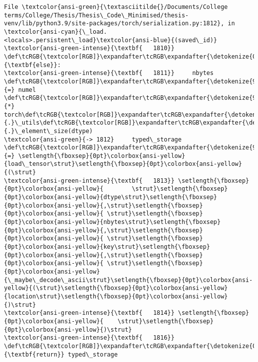 \documentclass[11pt]{article}
\begin{document}
\begin{Verbatim}[commandchars=\\\{\}, frame=single, framerule=2mm, rulecolor=\color{outerrorbackground}]
File \textcolor{ansi-green}{\textasciitilde{}/Documents/College terms/College/Thesis/Thesis\_Code\_Minimised/thesis-venv/lib/python3.9/site-packages/torch/serialization.py:1812}, in \textcolor{ansi-cyan}{\_load.<locals>.persistent\_load}\textcolor{ansi-blue}{(saved\_id)}
\textcolor{ansi-green-intense}{\textbf{   1810}} \def\tcRGB{\textcolor[RGB]}\expandafter\tcRGB\expandafter{\detokenize{0,135,0}}{\textbf{else}}:
\textcolor{ansi-green-intense}{\textbf{   1811}}     nbytes \def\tcRGB{\textcolor[RGB]}\expandafter\tcRGB\expandafter{\detokenize{98,98,98}}{=} numel \def\tcRGB{\textcolor[RGB]}\expandafter\tcRGB\expandafter{\detokenize{98,98,98}}{*} torch\def\tcRGB{\textcolor[RGB]}\expandafter\tcRGB\expandafter{\detokenize{98,98,98}}{.}\_utils\def\tcRGB{\textcolor[RGB]}\expandafter\tcRGB\expandafter{\detokenize{98,98,98}}{.}\_element\_size(dtype)
\textcolor{ansi-green}{-> 1812}     typed\_storage \def\tcRGB{\textcolor[RGB]}\expandafter\tcRGB\expandafter{\detokenize{98,98,98}}{=} \setlength{\fboxsep}{0pt}\colorbox{ansi-yellow}{load\_tensor\strut}\setlength{\fboxsep}{0pt}\colorbox{ansi-yellow}{(\strut}
\textcolor{ansi-green-intense}{\textbf{   1813}} \setlength{\fboxsep}{0pt}\colorbox{ansi-yellow}{        \strut}\setlength{\fboxsep}{0pt}\colorbox{ansi-yellow}{dtype\strut}\setlength{\fboxsep}{0pt}\colorbox{ansi-yellow}{,\strut}\setlength{\fboxsep}{0pt}\colorbox{ansi-yellow}{ \strut}\setlength{\fboxsep}{0pt}\colorbox{ansi-yellow}{nbytes\strut}\setlength{\fboxsep}{0pt}\colorbox{ansi-yellow}{,\strut}\setlength{\fboxsep}{0pt}\colorbox{ansi-yellow}{ \strut}\setlength{\fboxsep}{0pt}\colorbox{ansi-yellow}{key\strut}\setlength{\fboxsep}{0pt}\colorbox{ansi-yellow}{,\strut}\setlength{\fboxsep}{0pt}\colorbox{ansi-yellow}{ \strut}\setlength{\fboxsep}{0pt}\colorbox{ansi-yellow}{\_maybe\_decode\_ascii\strut}\setlength{\fboxsep}{0pt}\colorbox{ansi-yellow}{(\strut}\setlength{\fboxsep}{0pt}\colorbox{ansi-yellow}{location\strut}\setlength{\fboxsep}{0pt}\colorbox{ansi-yellow}{)\strut}
\textcolor{ansi-green-intense}{\textbf{   1814}} \setlength{\fboxsep}{0pt}\colorbox{ansi-yellow}{    \strut}\setlength{\fboxsep}{0pt}\colorbox{ansi-yellow}{)\strut}
\textcolor{ansi-green-intense}{\textbf{   1816}} \def\tcRGB{\textcolor[RGB]}\expandafter\tcRGB\expandafter{\detokenize{0,135,0}}{\textbf{return}} typed\_storage


\end{Verbatim}
\end{document}
